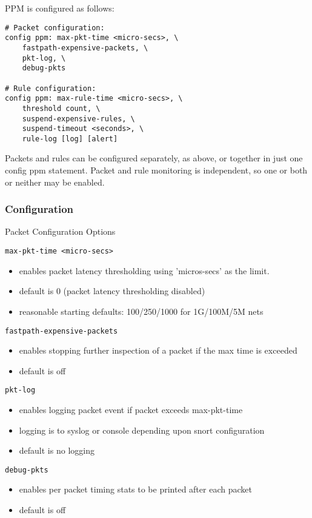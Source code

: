 \documentclass[english]{report}
\begin{document}
PPM is configured as follows:

\begin{verbatim}
# Packet configuration:
config ppm: max-pkt-time <micro-secs>, \
    fastpath-expensive-packets, \
    pkt-log, \
    debug-pkts

# Rule configuration:
config ppm: max-rule-time <micro-secs>, \
    threshold count, \
    suspend-expensive-rules, \
    suspend-timeout <seconds>, \
    rule-log [log] [alert]
\end{verbatim}

Packets and rules can be configured separately, as above, or together in
just one config ppm statement.  Packet and rule monitoring is independent,
so one or both or neither may be enabled.


\subsubsection{Configuration}

Packet Configuration Options

\texttt{max-pkt-time <micro-secs>}
\begin{itemize}
\item enables packet latency thresholding using 'micros-secs' as the limit.
\item default is 0 (packet latency thresholding disabled)
\item reasonable starting defaults: 100/250/1000 for 1G/100M/5M nets
\end{itemize}

\texttt{fastpath-expensive-packets}
\begin{itemize}
\item enables stopping further inspection of a packet if the max time is
      exceeded
\item default is off
\end{itemize}

\texttt{pkt-log}
\begin{itemize}
\item enables logging packet event if packet exceeds max-pkt-time
\item logging is to syslog or console depending upon snort configuration
\item default is no logging
\end{itemize}

\texttt{debug-pkts}
\begin{itemize}
\item enables per packet timing stats to be printed after each packet
\item default is off
\end{itemize}
\end{document}
